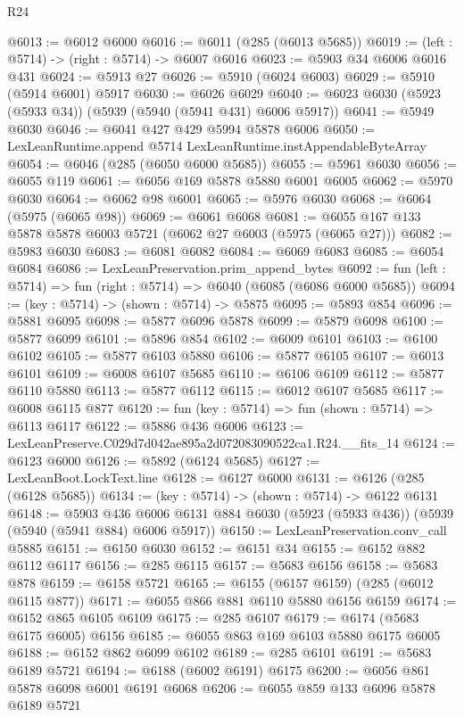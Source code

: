 \begin{lexlean}{R24}
\begin{coremodule}
@6013 := @6012 @6000
@6016 := @6011 (@285 (@6013 @5685))
@6019 := (left : @5714) -> (right : @5714) -> @6007 @6016
@6023 := @5903 @34 @6006 @6016 @431
@6024 := @5913 @27
@6026 := @5910 (@6024 @6003)
@6029 := @5910 (@5914 @6001) @5917
@6030 := @6026 @6029
@6040 := @6023 @6030 (@5923 (@5933 @34)) (@5939 (@5940 (@5941 @431) @6006 @5917))
@6041 := @5949 @6030
@6046 := @6041 @427 @429 @5994 @5878 @6006
@6050 := LexLeanRuntime.append @5714 LexLeanRuntime.instAppendableByteArray
@6054 := @6046 (@285 (@6050 @6000 @5685))
@6055 := @5961 @6030
@6056 := @6055 @119
@6061 := @6056 @169 @5878 @5880 @6001 @6005
@6062 := @5970 @6030
@6064 := @6062 @98 @6001
@6065 := @5976 @6030
@6068 := @6064 (@5975 (@6065 @98))
@6069 := @6061 @6068
@6081 := @6055 @167 @133 @5878 @5878 @6003 @5721 (@6062 @27 @6003 (@5975 (@6065 @27)))
@6082 := @5983 @6030
@6083 := @6081 @6082
@6084 := @6069 @6083
@6085 := @6054 @6084
@6086 := LexLeanPreservation.prim_append_bytes
@6092 := fun (left : @5714) => fun (right : @5714) => @6040 (@6085 (@6086 @6000 @5685))
@6094 := (key : @5714) -> (shown : @5714) -> @5875
@6095 := @5893 @854
@6096 := @5881 @6095
@6098 := @5877 @6096 @5878
@6099 := @5879 @6098
@6100 := @5877 @6099
@6101 := @5896 @854
@6102 := @6009 @6101
@6103 := @6100 @6102
@6105 := @5877 @6103 @5880
@6106 := @5877 @6105
@6107 := @6013 @6101
@6109 := @6008 @6107 @5685
@6110 := @6106 @6109
@6112 := @5877 @6110 @5880
@6113 := @5877 @6112
@6115 := @6012 @6107 @5685
@6117 := @6008 @6115 @877
@6120 := fun (key : @5714) => fun (shown : @5714) => @6113 @6117
@6122 := @5886 @436 @6006
@6123 := LexLeanPreserve.C029d7d042ae895a2d072083090522ca1.R24.__fits_14
@6124 := @6123 @6000
@6126 := @5892 (@6124 @5685)
@6127 := LexLeanBoot.LockText.line
@6128 := @6127 @6000
@6131 := @6126 (@285 (@6128 @5685))
@6134 := (key : @5714) -> (shown : @5714) -> @6122 @6131
@6148 := @5903
    @436
    @6006
    @6131
    @884
    @6030
    (@5923 (@5933 @436))
    (@5939 (@5940 (@5941 @884) @6006 @5917))
@6150 := LexLeanPreservation.conv_call @5885
@6151 := @6150 @6030
@6152 := @6151 @34
@6155 := @6152 @882 @6112 @6117
@6156 := @285 @6115
@6157 := @5683 @6156
@6158 := @5683 @878
@6159 := @6158 @5721
@6165 := @6155 (@6157 @6159) (@285 (@6012 @6115 @877))
@6171 := @6055 @866 @881 @6110 @5880 @6156 @6159
@6174 := @6152 @865 @6105 @6109
@6175 := @285 @6107
@6179 := @6174 (@5683 @6175 @6005) @6156
@6185 := @6055 @863 @169 @6103 @5880 @6175 @6005
@6188 := @6152 @862 @6099 @6102
@6189 := @285 @6101
@6191 := @5683 @6189 @5721
@6194 := @6188 (@6002 @6191) @6175
@6200 := @6056 @861 @5878 @6098 @6001 @6191 @6068
@6206 := @6055 @859 @133 @6096 @5878 @6189 @5721

\end{coremodule}
\end{lexlean}
